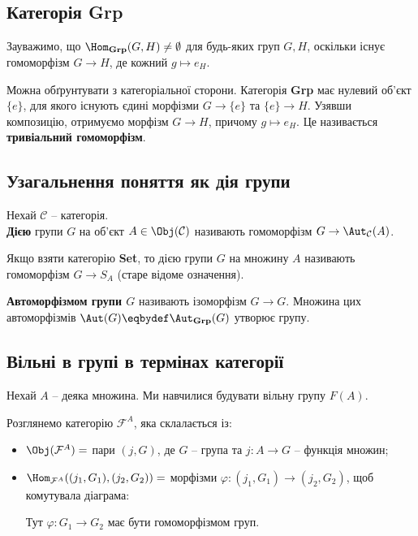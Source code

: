 \documentclass{math_library}
\begin{document}
\subsection{Категорія \textbf{Grp}}
Зауважимо, що $\Hom_\textbf{Grp}(G,H) \neq \emptyset$ для будь-яких груп $G,H$, оскільки існує гомоморфізм $G \to H$, де кожний $g \mapsto e_H$.

Можна обґрунтувати з категоріальної сторони. Категорія \textbf{Grp} має нулевий об'єкт $\{e\}$, для якого існують єдині морфізми $G \to \{e\}$ та $\{e\} \to H$. Узявши композицію, отримуємо морфізм $G \to H$, причому $g \mapsto e_H$. Це називається \textbf{тривіальний гомоморфізм}.
\newpage

\subsection{Узагальнення поняття як дія групи}
\begin{definition}
Нехай $\mathcal{C}$ -- категорія.\\
\textbf{Дією} групи $G$ на об'єкт $A \in \Obj(\mathcal{C})$ називають гомоморфізм $G \to \Aut_\mathcal{C}(A)$.
\end{definition}

Якщо взяти категорію \textbf{Set}, то дією групи $G$ на множину $A$ називають гомоморфізм $G \to S_A$ (старе відоме означення).

\begin{definition}
\textbf{Автоморфізмом групи $G$} називають ізоморфізм $G \to G$. Множина цих автоморфізмів $\Aut(G) \eqbydef \Aut_\textbf{Grp}(G)$ утворює групу.
\end{definition}

\subsection{Вільні в групі в термінах категорії}
Нехай $A$ -- деяка множина. Ми навчилися будувати вільну групу $F(A)$.

Розглянемо категорію $\mathcal{F}^A$, яка склалається із:
\begin{itemize}[nosep]
\item $\Obj(\mathcal{F}^A) =$ пари $(j,G)$, де $G$ -- група та $j \colon A \to G$ -- функція множин;
\item $\Hom_{\mathcal{F}^A}((j_1,G_1),(j_2,G_2)) =$ морфізми $\varphi \colon (j_1,G_1) \to (j_2,G_2)$, щоб комутувала діаграма:
\begin{figure}[H]
\centering
{}
\end{figure}
Тут $\varphi \colon G_1 \to G_2$ має бути гомоморфізмом груп.
\end{itemize}
\end{document}
